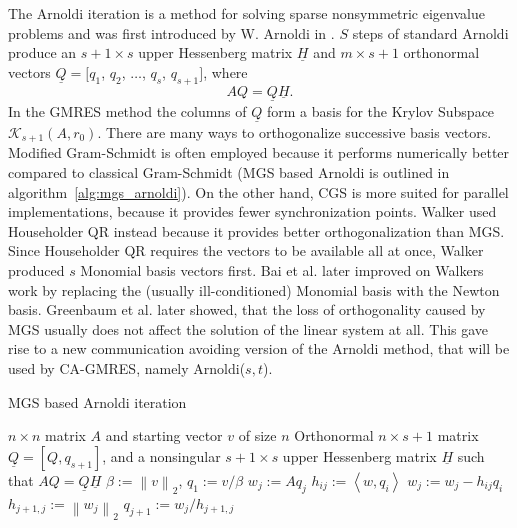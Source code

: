 \documentclass{scrartcl}
\numberwithin{equation}{section}
\newcommand{\norm}[1]{\left\lVert#1\right\rVert}
\begin{document}
The Arnoldi iteration is a method for solving sparse nonsymmetric eigenvalue problems and was first introduced by W. Arnoldi in \cite{arnoldi:hal-01712943}. $S$ steps of standard Arnoldi produce an $s + 1 \times s$ upper Hessenberg matrix $\underline{H}$ and $m \times s + 1$ orthonormal vectors $\underline{Q} = [q_1$, $q_2$, $\ldots$, $q_s$, $q_{s + 1}]$, where 
\begin{equation} \label{eq:AQ=QH}
	AQ = \underline{Q} \underline{H}.
\end{equation}
In the GMRES method the columns of $\underline{Q}$ form a basis for the Krylov Subspace $\mathcal{K}_{s + 1}(A, r_0)$. There are many ways to orthogonalize successive basis vectors. Modified Gram-Schmidt is often employed because it performs numerically better compared to classical Gram-Schmidt (MGS based Arnoldi is outlined in algorithm~\ref{alg:mgs_arnoldi}). On the other hand, CGS is more suited for parallel implementations, because it provides fewer synchronization points.
Walker \cite{doi:10.1137/Walker} used Householder QR instead because it provides better orthogonalization than MGS. Since Householder QR requires the vectors to be available all at once, Walker produced $s$ Monomial basis vectors first. Bai et al. \cite{doi:10.1093/imanum/NewtonGMRES_bai} later improved on Walkers work by replacing the (usually ill-conditioned) Monomial basis with the Newton basis. Greenbaum et al. \cite{Greenbaum97numericalbehaviour} later showed, that the loss of orthogonality caused by MGS usually does not affect the solution of the linear system at all. This gave rise to a new communication avoiding version of the Arnoldi method, that will be used by CA-GMRES, namely Arnoldi($s,t$).

\begin{algorithm}[H]
\caption{MGS based Arnoldi iteration}
\label{alg:mgs_arnoldi}
\begin{algorithmic}[1]
    \REQUIRE $n \times n$ matrix $A$ and  starting vector $v$ of size $n$
	\ENSURE Orthonormal $n \times s + 1$ matrix $\underline{Q} = [Q,q_{s + 1}]$, and a nonsingular $s + 1 \times s$ upper Hessenberg matrix $\underline{H}$ such that $AQ = \underline{Q} \underline{H}$
    \STATE $\beta := \norm{v}_2$, $q_1 := v/\beta$ 
		\STATE $w_j := Aq_j$
			\STATE $h_{ij} :=  \left< w, q_i \right>$
			\STATE $w_j := w_j - h_{ij}q_i$
		\ENDFOR
		\STATE $h_{j + 1, j} := \norm{w_j}_2$
		\STATE $q_{j + 1} := w_j / h_{j + 1, j}$
	\ENDFOR
\end{algorithmic}
\end{algorithm}
\end{document}
